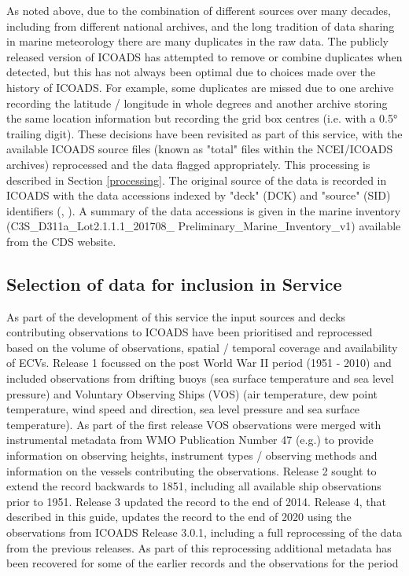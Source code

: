 As noted above, due to the combination of different sources over many decades, including from different national archives, and the long tradition of data sharing in marine meteorology there are many duplicates in the raw data. 
The publicly released version of ICOADS has attempted to remove or combine duplicates when detected, but this has not always been optimal due to choices made over the history of ICOADS. 
For example, some duplicates are missed due to one archive recording the latitude / longitude in whole degrees and another archive storing the same location information but recording the grid box centres (i.e. with a 0.5° trailing digit). 
These decisions have been revisited as part of this service, with the available ICOADS source files (known as "total" files within the NCEI/ICOADS archives) reprocessed and the data flagged appropriately.
This processing is described in Section \ref{processing}.
The original source of the data is recorded in ICOADS with the data accessions indexed by "deck" (DCK) and "source" (SID) identifiers (\cite{Woodruff1987}, \cite{Freeman2017}). 
A summary of the data accessions is given in the marine inventory (C3S\_D311a\_Lot2.1.1.1\_201708\_ Preliminary\_Marine\_Inventory\_v1) available from the CDS website.

\subsection{Selection of data for inclusion in Service}
As part of the development of this service the input sources and decks contributing observations to ICOADS have been prioritised and reprocessed based on the volume of observations, spatial / temporal coverage and availability of ECVs. 
Release 1 focussed on the post World War II period (1951 - 2010) and included observations from drifting buoys (sea surface temperature and sea level pressure) and Voluntary Observing Ships (VOS) (air temperature, dew point temperature, wind speed and direction, sea level pressure and sea surface temperature).
As part of the first release VOS observations were merged with instrumental metadata from WMO Publication Number 47 (e.g.\cite{Kent2007}) to provide information on observing heights, instrument types / observing methods and information on the vessels contributing the observations. 
Release 2 sought to extend the record backwards to 1851, including all available ship observations prior to 1951. 
Release 3 updated the record to the end of 2014. 
Release 4, that described in this guide, updates the record to the end of 2020 using the observations from ICOADS Release 3.0.1, including a full reprocessing of the data from the previous releases. As part of this reprocessing additional metadata has been recovered for some of the earlier records and the observations for the period 

